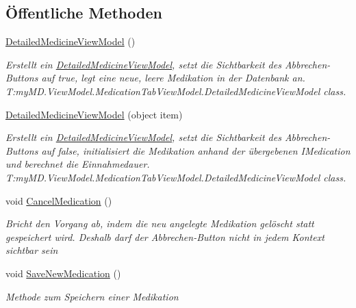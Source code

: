 \subsection*{Öffentliche Methoden}
\begin{DoxyCompactItemize}
\item 
\mbox{\hyperlink{classmy_m_d_1_1_view_model_1_1_medication_tab_view_model_1_1_detailed_medicine_view_model_a72a7e47668456e870fe1345d67c92f17}{Detailed\+Medicine\+View\+Model}} ()
\begin{DoxyCompactList}\small\item\em Erstellt ein \mbox{\hyperlink{classmy_m_d_1_1_view_model_1_1_medication_tab_view_model_1_1_detailed_medicine_view_model}{Detailed\+Medicine\+View\+Model}}, setzt die Sichtbarkeit des Abbrechen-\/\+Buttons auf true, legt eine neue, leere Medikation in der Datenbank an. ~\newline
T\+:my\+M\+D.\+View\+Model.\+Medication\+Tab\+View\+Model.\+Detailed\+Medicine\+View\+Model class. \end{DoxyCompactList}\item 
\mbox{\hyperlink{classmy_m_d_1_1_view_model_1_1_medication_tab_view_model_1_1_detailed_medicine_view_model_a769d397e08d7ea770c0e24123624d287}{Detailed\+Medicine\+View\+Model}} (object item)
\begin{DoxyCompactList}\small\item\em Erstellt ein \mbox{\hyperlink{classmy_m_d_1_1_view_model_1_1_medication_tab_view_model_1_1_detailed_medicine_view_model}{Detailed\+Medicine\+View\+Model}}, setzt die Sichtbarkeit des Abbrechen-\/\+Buttons auf false, initialisiert die Medikation anhand der übergebenen I\+Medication und berechnet die Einnahmedauer. T\+:my\+M\+D.\+View\+Model.\+Medication\+Tab\+View\+Model.\+Detailed\+Medicine\+View\+Model class. \end{DoxyCompactList}\item 
void \mbox{\hyperlink{classmy_m_d_1_1_view_model_1_1_medication_tab_view_model_1_1_detailed_medicine_view_model_a481a7dd27905ec3a70ca7e5bb0c4f5d4}{Cancel\+Medication}} ()
\begin{DoxyCompactList}\small\item\em Bricht den Vorgang ab, indem die neu angelegte Medikation gelöscht statt gespeichert wird. Deshalb darf der Abbrechen-\/\+Button nicht in jedem Kontext sichtbar sein \end{DoxyCompactList}\item 
void \mbox{\hyperlink{classmy_m_d_1_1_view_model_1_1_medication_tab_view_model_1_1_detailed_medicine_view_model_ae30844bb875a0f1c59a450e9fd4ecebd}{Save\+New\+Medication}} ()
\begin{DoxyCompactList}\small\item\em Methode zum Speichern einer Medikation \end{DoxyCompactList}\end{DoxyCompactItemize}
